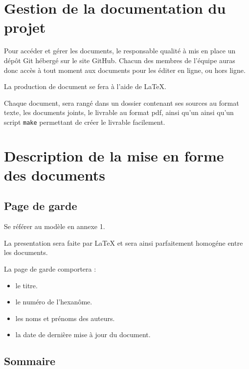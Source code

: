 \section{Gestion de la documentation du projet}

Pour accéder et gérer les documents, le responsable qualité à mis en place un dépôt Git hébergé sur le site GitHub.
Chacun des membres de l’équipe auras donc accès à tout moment aux documents pour les éditer en ligne, ou hors ligne.

La production de document se fera à l’aide de LaTeX.

Chaque document, sera rangé dans un dossier contenant ses sources au format texte, les documents joints, le livrable au format pdf, ainsi qu'un  ainsi qu'un script \texttt{make} permettant de créer le livrable facilement.

\section{Description de la mise en forme des documents}



\subsection{Page de garde}
   Se référer au modèle en annexe 1.

   La presentation sera faite par LaTeX et sera ainsi parfaitement homogéne entre les documents.

   La page de garde comportera :
   \begin{itemize}
      \item le titre.
      \item le numéro de l'hexanôme.
      \item les noms et prénoms des auteurs.
      \item la date de dernière mise à jour du document.
   \end{itemize}

\subsection{Sommaire}
  
